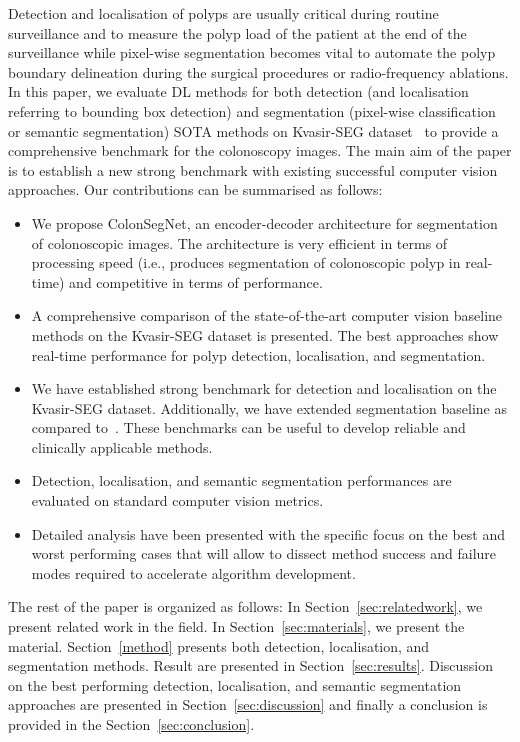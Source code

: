 \documentclass[journal]{IEEEtran}
\begin{document}
Detection and localisation of polyps are usually critical during routine surveillance and to measure the polyp load of the patient at the end of the surveillance while pixel-wise segmentation becomes vital to automate the polyp boundary delineation during the surgical procedures or radio-frequency ablations. In this paper, we evaluate \ac{DL} methods for both detection (and localisation referring to bounding box detection) and segmentation (pixel-wise classification or semantic segmentation) SOTA methods on Kvasir-SEG dataset~\cite{jha2020kvasir} to provide a comprehensive benchmark for the colonoscopy images. The main aim of the paper is to establish a new strong benchmark with existing successful computer vision approaches. 
Our contributions can be summarised as follows:
\begin{itemize}
     
    \item We propose ColonSegNet, an encoder-decoder architecture for segmentation of colonoscopic images. The architecture is very efficient in terms of processing speed (i.e., produces segmentation of colonoscopic polyp in real-time) and competitive in terms of performance.
     
   \item A comprehensive comparison of the state-of-the-art computer vision baseline methods on the Kvasir-SEG dataset is presented. The best approaches show real-time performance for polyp detection, localisation, and segmentation.  



    \item We have established strong benchmark for detection and localisation on the Kvasir-SEG dataset. Additionally, we have extended segmentation baseline as compared to~\cite{jha2019resunet++,jha2020kvasir,jha2021comprehensive}. These benchmarks can be useful to develop reliable and clinically applicable methods. 
    
    \item Detection, localisation, and semantic segmentation performances are evaluated on standard computer vision metrics.
    
    \item {Detailed analysis have been presented with the specific focus on the best and worst performing cases that will allow to dissect method success and failure modes required to accelerate algorithm development.} 
\end{itemize}

The rest of the paper is organized as follows: In Section~\ref{sec:relatedwork}, we present related work in the field. In Section~\ref{sec:materials}, we present the material. Section~\ref{method} presents both detection, localisation, and segmentation methods. Result are presented in Section~\ref{sec:results}. Discussion on the best performing detection, localisation, and semantic segmentation approaches are presented in Section~\ref{sec:discussion} and finally a conclusion is provided in the Section~\ref{sec:conclusion}. 
\end{document}
